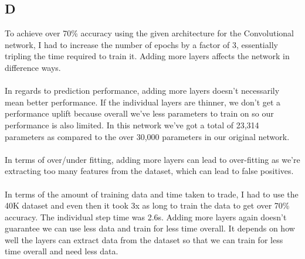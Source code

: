 \documentclass[11pt]{article} %
\begin{document}
\subsection{D}
To achieve over 70\% accuracy using the given architecture for the Convolutional network, I had to increase the number of epochs by a factor of 3, essentially tripling the time required to train it.  Adding more layers affects the network in difference ways. \\\\In regards to  prediction performance,  adding more layers doesn't necessarily mean better performance.  If the individual layers are thinner,  we don't get a performance uplift because overall we've less parameters to train on so our performance is also limited.  In this network we've got a total of 23,314 parameters as compared to the over 30,000 parameters in our original network.
\\\\In terms of over/under fitting,  adding more layers can lead to over-fitting as we're extracting too many features from the dataset, which can lead to false positives.  \\\\ In terms of the amount of training data and time taken to trade,  I had to use the 40K dataset and even then it took 3x as long to train the data to get over 70\% accuracy.  The individual step time was 2.6s.  Adding more layers again doesn't guarantee we can use less data and train for less time overall.  It depends on how well the layers can extract data from the dataset so that we can train for less time overall and need less data. 
\end{document}
